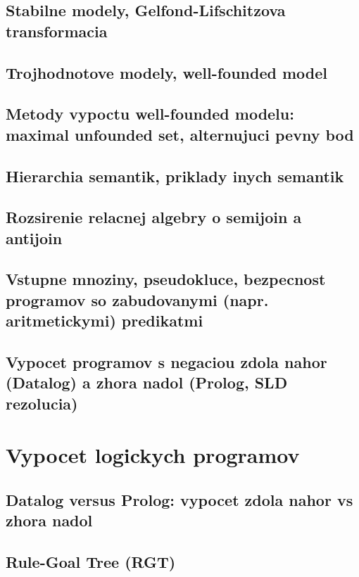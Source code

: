 \documentclass[12pt,a4paper]{article}
\begin{document}
\subsection{Stabilne modely, Gelfond-Lifschitzova transformacia}

\subsection{Trojhodnotove modely, well-founded model}

\subsection{Metody vypoctu well-founded modelu: maximal unfounded set, alternujuci pevny bod}

\subsection{Hierarchia semantik, priklady inych semantik}

\subsection{Rozsirenie relacnej algebry o semijoin a antijoin}

\subsection{Vstupne mnoziny, pseudokluce, bezpecnost programov so zabudovanymi (napr. aritmetickymi) predikatmi}

\subsection{Vypocet programov s negaciou zdola nahor (Datalog) a zhora nadol (Prolog, SLD rezolucia)}

\section{Vypocet logickych programov}

\subsection{Datalog versus Prolog: vypocet zdola nahor vs zhora nadol}

\subsection{Rule-Goal Tree (RGT)}
\end{document}
